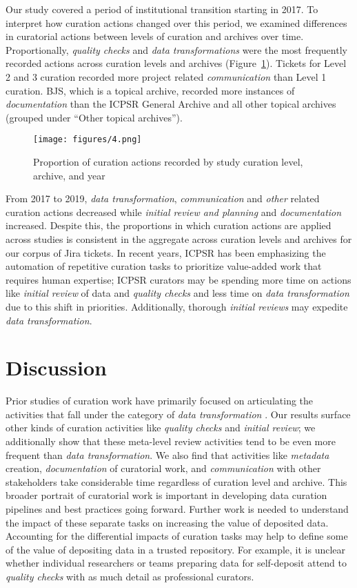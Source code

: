 \documentclass[conference]{IEEEtran}
\begin{document}
Our study covered a period of institutional transition starting in 2017. To interpret how curation actions changed over this period, we examined differences in curatorial actions between levels of curation and archives over time. Proportionally, \textit{quality checks} and \textit{data transformations} were the most frequently recorded actions across curation levels and archives (Figure~\ref{fig:figure4}). Tickets for Level 2 and 3 curation recorded more project related \textit{communication} than Level 1 curation. BJS, which is a topical archive, recorded more instances of \textit{documentation} than the ICPSR General Archive and all other topical archives (grouped under “Other topical archives”).

\begin{figure}[ht]
\texttt{[image: figures/4.png]}
\caption{Proportion of curation actions recorded by study curation level, archive, and year}
\label{fig:figure4}
\end{figure}

From 2017 to 2019, \textit{data transformation}, \textit{communication} and \textit{other} related curation actions decreased while \textit{initial review and planning} and \textit{documentation} increased. Despite this, the proportions in which curation actions are applied across studies is consistent in the aggregate across curation levels and archives for our corpus of Jira tickets. In recent years, ICPSR has been emphasizing the automation of repetitive curation tasks to prioritize value-added work that requires human expertise; ICPSR curators may be spending more time on actions like \textit{initial review} of data and \textit{quality checks} and less time on \textit{data transformation} due to this shift in priorities. Additionally, thorough \textit{initial reviews} may expedite \textit{data transformation}.

\section{Discussion}
\label{discussion}
Prior studies of curation work have primarily focused on articulating the activities that fall under the category of \textit{data transformation} \cite{Doty2014-wy, Chao2015-bq, Johnston2017-cq}. Our results surface other kinds of curation activities like \textit{quality checks} and \textit{initial review}; we additionally show that these meta-level review activities tend to be even more frequent than \textit{data transformation}. We also find that activities like \textit{metadata} creation, \textit{documentation} of curatorial work, and \textit{communication} with other stakeholders take considerable time regardless of curation level and archive. This broader portrait of curatorial work is important in developing data curation pipelines and best practices going forward. Further work is needed to understand the impact of these separate tasks on increasing the value of deposited data. Accounting for the differential impacts of curation tasks may help to define some of the value of depositing data in a trusted repository. For example, it is unclear whether individual researchers or teams preparing data for self-deposit attend to \textit{quality checks} with as much detail as professional curators. 
\end{document}
